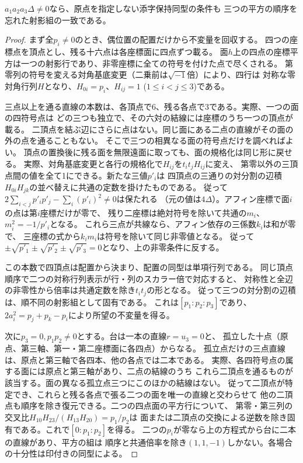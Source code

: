 \begin{theorem}[階数10の全特殊値で印を忘れた同型]\label{thm:cross-product-unmarked-isom}
$a_1a_2a_3\Delta\ne0$なら、原点を指定しない添字保持同型の条件も
三つの平方の順序を忘れた射影組の一致である。
\end{theorem}
\begin{proof}
まず全$p_i\ne0$のとき、偶位置の配置だけから不変量を回収する。
四つの座標点を頂点とし、残る十六点は各座標面に四点ずつ載る。
面$h$上の四点の座標平方は一つの射影行であり、非零座標に全ての符号を付けた点で尽くされる。
第零列の符号を変える対角基底変更（二乗前は$\sqrt{-1}$倍）により、四行は
対称な零対角行列$H$となり、$H_{0i}=p_i$、$H_{ij}=1$ ($1\le i<j\le3$)である。

三点以上を通る直線の本数は、各頂点で6、残る各点で3である。実際、一つの面の四符号点は
どの三つも独立で、その六対の結線には座標のうち一つの頂点が載る。
二頂点を結ぶ辺にさらに点はない。同じ面にある二点の直線がその面の外の点を通ることもない。
そこで三つの相異なる面の符号点だけを調べればよい。
頂点の置換後に残る面を無限遠面に取っても、面の規格化は同じ形に戻せる。
実際、対角基底変更と各行の規格化で$H_{ij}$を$t_i t_j H_{ij}$に変え、
第零以外の三頂点間の値を全て1にできる。新たな三値$p'_i$は
四頂点の三通りの対分割の辺積$H_{0i}H_{jk}$の並べ替えに共通の定数を掛けたものである。
従って$2\sum_{i<j}p'_ip'_j-\sum_i(p'_i)^2\ne0$は保たれる
（元の値は$4\Delta$）。アフィン座標で面$i$の点は第$i$座標だけが零で、
残り二座標は絶対符号を除いて共通の$m_i$、$m_i^2=-1/p'_i$となる。
これら三点が共線なら、アフィン依存の三係数$k_i$は和が零で、
三座標の式から$k_i m_i$は符号を除いて同じ非零値となる。
従って$\pm\sqrt{p'_1}\pm\sqrt{p'_2}\pm\sqrt{p'_3}=0$となり、上の非零条件に反する。

この本数で四頂点は配置から決まり、配置の同型は単項行列である。
同じ頂点順序で二つの対称行列表示が行・列のスカラー倍で対応すると、
対称性と全辺の非零性から倍率は共通定数を除き$t_i t_j$の形となる。
従って三つの対分割の辺積は、順不同の射影組として固有である。
これは$[p_1:p_2:p_3]$であり、$2a_i^2=p_j+p_k-p_i$により所望の不変量を得る。

次に$p_3=0,p_1p_2\ne0$とする。台は一本の直線$r=u_3=0$と、
孤立した十点（原点、第三軸、第一・第二座標面に各四点）からなる。
孤立点だけの三点直線は、原点と第三軸で各四本、他の各点では二本である。
実際、各四符号点の属する面には原点と第三軸があり、二点の結線のうち
これら二頂点を通るものが該当する。面の異なる孤立点三つにこのほかの結線はない。
従って二頂点が特定でき、これらと残る各点で張る二つの面を唯一の直線と交わらせて
他の二頂点も順序を除き復元できる。二つの四点面の平方行について、
第零・第三列の交叉比$H_{10}H_{23}/(H_{13}H_{20})=p_1/p_2$は
面または二頂点の交換による逆数を除き固有である。これで$[0:p_1:p_2]$を得る。
二つの$p_i$が零なら上の方程式から台に二本の直線があり、平方の組は
順序と共通倍率を除き$(1,1,-1)$しかない。各場合の十分性は印付きの同型による。
\end{proof}

